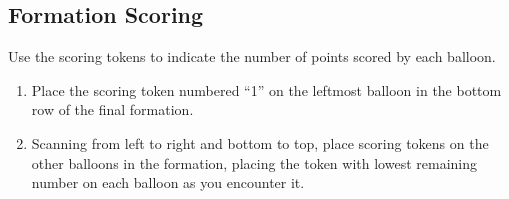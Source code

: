 \documentclass[a6paper, 11pt, parskip=half, DIV=15]{scrartcl}
\begin{document}
%
%
%
%
%

\newpage
\enlargethispage{1.75\baselineskip}

\subsection*{Formation Scoring}
Use the scoring tokens to indicate the number of points scored by each balloon.
\begin{enumerate}
  \item Place the scoring token numbered ``1'' on the leftmost balloon in the bottom row of the final formation.
  \item Scanning from left to right and bottom to top, place scoring tokens on the other balloons in the formation, placing the token with lowest remaining number on each balloon as you encounter it.
\end{enumerate}

\end{document}
